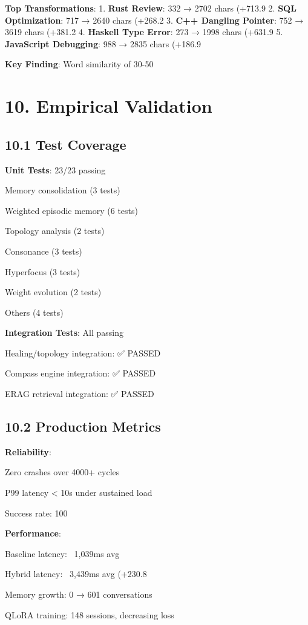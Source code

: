\documentclass[11pt,a4paper]{article}
\begin{document}
\textbf{Top Transformations}:
1. \textbf{Rust Review}: 332 → 2702 chars (+713.9%
2. \textbf{SQL Optimization}: 717 → 2640 chars (+268.2%
3. \textbf{C++ Dangling Pointer}: 752 → 3619 chars (+381.2%
4. \textbf{Haskell Type Error}: 273 → 1998 chars (+631.9%
5. \textbf{JavaScript Debugging}: 988 → 2835 chars (+186.9%

\textbf{Key Finding}: Word similarity of 30-50%

\section{10. Empirical Validation}

\subsection{10.1 Test Coverage}

\textbf{Unit Tests}: 23/23 passing
\item Memory consolidation (3 tests)
\item Weighted episodic memory (6 tests)
\item Topology analysis (2 tests)
\item Consonance (3 tests)
\item Hyperfocus (3 tests)
\item Weight evolution (2 tests)
\item Others (4 tests)

\textbf{Integration Tests}: All passing
\item Healing/topology integration: ✅ PASSED
\item Compass engine integration: ✅ PASSED
\item ERAG retrieval integration: ✅ PASSED

\subsection{10.2 Production Metrics}

\textbf{Reliability}:
\item Zero crashes over 4000+ cycles
\item P99 latency < 10s under sustained load
\item Success rate: 100%

\textbf{Performance}:
\item Baseline latency: ~1,039ms avg
\item Hybrid latency: ~3,439ms avg (+230.8%
\item Memory growth: 0 → 601 conversations
\item QLoRA training: 148 sessions, decreasing loss
\end{document}
